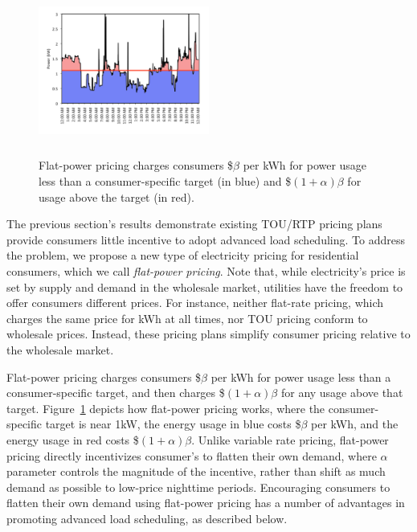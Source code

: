 \begin{figure}[t]
\begin{center}
\includegraphics[width=0.50\textwidth,height=5.5cm]{graphs/new_plan/data-reverse.pdf}
\end{center}
\vspace{-0.25cm}
\caption{Flat-power pricing charges consumers \$$\beta$ per kWh for power usage less than a consumer-specific target (in blue) and \$$(1+\alpha)\beta$ for usage above the target (in red).}
\label{fig:newpricing}
\vspace{-0.15cm}
\end{figure}

The previous section's results demonstrate existing TOU/RTP pricing plans provide consumers little incentive to adopt advanced load scheduling.  To address the problem, we propose a new type of electricity pricing for residential consumers, which we call \emph{flat-power pricing}. Note that, while electricity's price is set by supply and demand in the wholesale market, utilities have the freedom to offer consumers different prices.  For instance, neither flat-rate pricing, which charges the same price for kWh at all times, nor TOU pricing conform to wholesale prices.  Instead, these pricing plans simplify consumer pricing relative to the wholesale market. 

Flat-power pricing charges consumers \$$\beta$ per kWh for power usage less than a consumer-specific target, and then charges \$$(1+\alpha)\beta$ for any usage above that target.   Figure~\ref{fig:newpricing} depicts how flat-power pricing works, where the consumer-specific target is near 1kW, the energy usage in blue costs \$$\beta$ per kWh, and the energy usage in red costs \$$(1+\alpha)\beta$.  Unlike variable rate pricing, flat-power pricing directly incentivizes consumer's to flatten their own demand, where $\alpha$ parameter controls the magnitude of the incentive, rather than shift as much demand as possible to low-price nighttime periods.  Encouraging consumers to flatten their own demand using flat-power pricing has a number of advantages in promoting advanced load scheduling, as described below.

